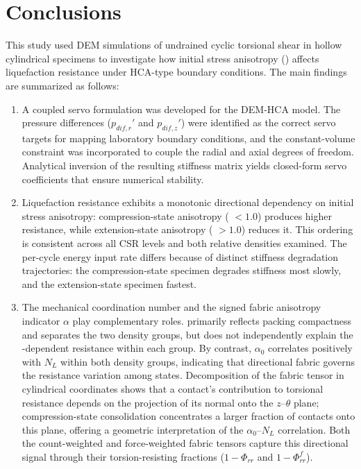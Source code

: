 \section{Conclusions}
\label{sec:conclusions}

This study used DEM simulations of undrained cyclic torsional shear in hollow cylindrical specimens to investigate how initial stress anisotropy (\Kzero{}) affects liquefaction resistance under HCA-type boundary conditions. The main findings are summarized as follows:

\begin{enumerate}
\item A coupled servo formulation was developed for the DEM-HCA model. The pressure differences ($p_{dif,r}'$ and $p_{dif,z}'$) were identified as the correct servo targets for mapping laboratory boundary conditions, and the constant-volume constraint was incorporated to couple the radial and axial degrees of freedom. Analytical inversion of the resulting stiffness matrix yields closed-form servo coefficients that ensure numerical stability.

\item Liquefaction resistance exhibits a monotonic directional dependency on initial stress anisotropy: compression-state anisotropy (\Kzero{} $< 1.0$) produces higher resistance, while extension-state anisotropy (\Kzero{} $> 1.0$) reduces it. This ordering is consistent across all CSR levels and both relative densities examined. The per-cycle energy input rate differs because of distinct stiffness degradation trajectories: the compression-state specimen degrades stiffness most slowly, and the extension-state specimen fastest.

\item The mechanical coordination number \Zm{} and the signed fabric anisotropy indicator $\alpha$ play complementary roles. \Zm{} primarily reflects packing compactness and separates the two density groups, but does not independently explain the \Kzero{}-dependent resistance within each group. By contrast, $\alpha_0$ correlates positively with $N_L$ within both density groups, indicating that directional fabric governs the resistance variation among \Kzero{} states. Decomposition of the fabric tensor in cylindrical coordinates shows that a contact's contribution to torsional resistance depends on the projection of its normal onto the $z$--$\theta$ plane; compression-state consolidation concentrates a larger fraction of contacts onto this plane, offering a geometric interpretation of the $\alpha_0$--$N_L$ correlation. Both the count-weighted and force-weighted fabric tensors capture this directional signal through their torsion-resisting fractions ($1 - \Phi_{rr}$ and $1 - \Phi^f_{rr}$).


\end{enumerate}
